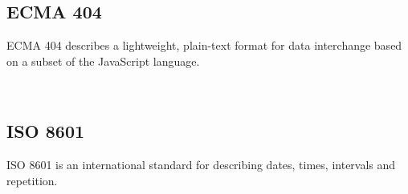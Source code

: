 \documentclass[10pt]{article}
\begin{document}
\subsection{ECMA 404}
ECMA 404 describes a lightweight, plain-text format for data
interchange based on a subset of the JavaScript language.

\\


\subsection{ISO 8601}
ISO 8601 is an international standard for describing dates, times,
intervals and repetition.

\\
\end{document}
